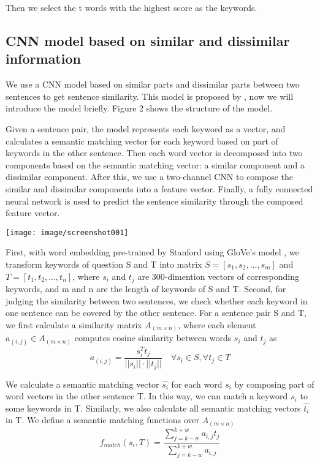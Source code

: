 \documentclass[11pt,a4paper]{article}
\begin{document}
Then we select the t words with the highest score as the keywords.
\subsection{CNN model based on similar and dissimilar information}

We use a CNN model based on similar parts and dissimilar parts between two sentences to get sentence similarity. This model is proposed by \cite{Wang2016SentenceSL}, now we will introduce the model briefly. Figure 2 shows the structure of the model.

Given a sentence pair, the model represents each keyword as a vector, and calculates a semantic matching vector for each keyword based on part of keywords in the other sentence. Then each word vector is decomposed into two components  based on the semantic matching vector: a similar component and a dissimilar component. After this, we use a two-channel CNN to compose the similar and dissimilar components into a feature vector. Finally, a fully connected neural network is used to predict the sentence similarity through the composed feature vector.

\begin{center}
\texttt{[image: image/screenshot001]}
\end{center}

First, with word embedding pre-trained by Stanford using GloVe's model \cite{pennington2014glove}, we transform keywords of question S and T into matrix $S=[s_{1},s_{2},...,s_{m}]$ and $T=[t_{1},t_{2},...,t_{n}]$, where $s_{i}$ and $t_{j}$ are 300-dimention vectors of corresponding keywords, and m and n are the length of keywords of S and T.
Second, for judging the similarity between two sentences, we check whether each keyword in one sentence can be covered by the other sentence. For a sentence pair S and T, we first calculate a similarity matrix $A_{(m\times
	n)}$, where each element $a_{(i,j)}\in
A_{(m\times
	n)}$ computes cosine similarity between words $s_{i}$ and $t_{j}$ as
\begin{equation}a_{(i,j)}=\frac{s_{i}^{T}t_{j}}{||s_{i}||\cdot||t_{j}||}\quad\forall
s_{i}\in
S,\forall
t_{j}\in
T \end{equation}

We calculate a semantic matching vector $\hat{s_{i}}$ for each word $s_{i}$ by composing part of word vectors in the other sentence T. In this way, we can match a keyword $s_{i}$ to some keywords in T. Similarly, we also calculate all semantic matching vectors $\hat{t_{i}}$ in T. We define a semantic matching functions over $A_{(m\times
	n)}$
\begin{equation}f_{match}(s_{i},T)=\frac{\sum_{j=k-w}^{k+w}a_{i,j}t_{j}}{\sum_{j=k-w}^{k+w}a_{i,j}}\end{equation}
\end{document}
